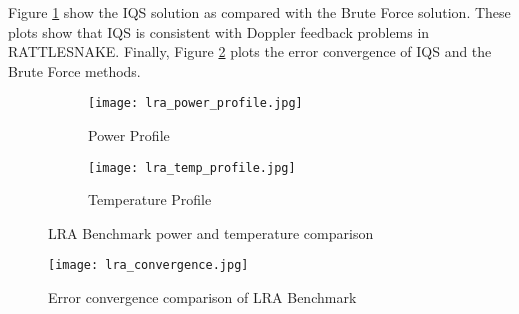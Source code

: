 \documentclass[10pt]{scrartcl}
\begin{document}
Figure \ref{fig:LRA_plots} show the IQS  solution as compared with the Brute Force solution.    These plots show that IQS is consistent with Doppler feedback problems in RATTLESNAKE.  Finally, Figure \ref{fig:lra_conv} plots the error convergence of IQS and the Brute Force methods.  

\begin{figure}[!htbp]
\begin{center}
\begin{subfigure}[!htbp]{0.49\textwidth}
\texttt{[image: lra\_power\_profile.jpg]}
\caption{Power Profile}
\end{subfigure}
\begin{subfigure}[!htbp]{0.49\textwidth}
\texttt{[image: lra\_temp\_profile.jpg]}
\caption{Temperature Profile}
\end{subfigure}
\caption{LRA Benchmark power and temperature comparison}
\label{fig:LRA_plots}
\end{center}
\end{figure}

\begin{figure}[!htbp]
\centering
\texttt{[image: lra\_convergence.jpg]}
\caption{Error convergence comparison of LRA Benchmark}
\label{fig:lra_conv}
\end{figure}
\end{document}
